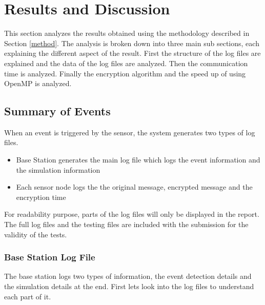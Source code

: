 \documentclass[conference]{IEEEtran}
\begin{document}
	\section{Results and Discussion} \label{res}
	
	This section analyzes the results obtained using the methodology described in Section \ref{method}. The analysis is broken down into three main sub sections, each explaining the different aspect of the result. First the structure of the log files are explained and the data of the log files are analyzed. Then the communication time is analyzed. Finally the encryption algorithm and the speed up of using OpenMP is analyzed.
	
	\subsection{Summary of Events} \label{eventsum}
	
	When an event is triggered by the sensor, the system generates two types of log files. 

	\begin{itemize}
		\item Base Station generates the main log file which logs the event information and the simulation information
		\item Each sensor node logs the the original message, encrypted message and the encryption time
	\end{itemize}

	For readability purpose, parts of the log files will only be displayed in the report. The full log files and the testing files are included with the submission for the validity of the tests.

	\subsubsection{Base Station Log File}
	
	The base station logs two types of information, the event detection details and the simulation details at the end. First lets look into the log files to understand each part of it. 
	
\end{document}
